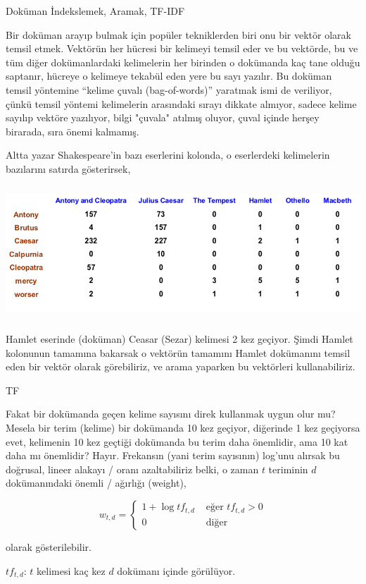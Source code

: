 \documentclass[12pt,fleqn]{article}\usepackage{../../common}
\begin{document}
Doküman İndekslemek, Aramak, TF-IDF

Bir doküman arayıp bulmak için popüler tekniklerden biri onu bir vektör olarak
temsil etmek. Vektörün her hücresi bir kelimeyi temsil eder ve bu vektörde, bu
ve tüm diğer dokümanlardaki kelimelerin her birinden o dokümanda kaç tane olduğu
saptanır, hücreye o kelimeye tekabül eden yere bu sayı yazılır. Bu doküman
temsil yöntemine ``kelime çuvalı (bag-of-words)'' yaratmak ismi de veriliyor,
çünkü temsil yöntemi kelimelerin arasındaki sırayı dikkate almıyor, sadece
kelime sayılıp vektöre yazılıyor, bilgi "çuvala" atılmış oluyor, çuval içinde
herşey birarada, sıra önemi kalmamış.

Altta yazar Shakespeare'in bazı eserlerini kolonda, o eserlerdeki kelimelerin
bazılarını satırda gösterirsek,

\includegraphics[height=5cm]{shake.png}

Hamlet eserinde (doküman) Ceasar (Sezar) kelimesi 2 kez geçiyor. Şimdi Hamlet
kolonunun tamamına bakarsak o vektörün tamamını Hamlet dokümanını temsil eden bir
vektör olarak görebiliriz, ve arama yaparken bu vektörleri kullanabiliriz.

TF

Fakat bir dokümanda geçen kelime sayısını direk kullanmak uygun olur mu? Mesela
bir terim (kelime) bir dokümanda 10 kez geçiyor, diğerinde 1 kez geçiyorsa evet,
kelimenin 10 kez geçtiği dokümanda bu terim daha önemlidir, ama 10 kat daha mı
önemlidir?  Hayır. Frekansın (yani terim sayısının) log'unu alırsak bu doğrusal,
lineer alakayı / oranı azaltabiliriz belki, o zaman $t$ teriminin $d$
dokümanındaki önemli / ağırlığı (weight),

$$ w_{t,d} = \left\{ \begin{array}{ll}
1 + \log tf_{t,d} & \textrm{ eğer }  tf_{t,d} > 0 \\
0 & \textrm { diğer }
\end{array} \right. $$

olarak gösterilebilir. 

$tf_{t,d}$: $t$ kelimesi kaç kez $d$ dokümanı içinde görülüyor.
\end{document}
